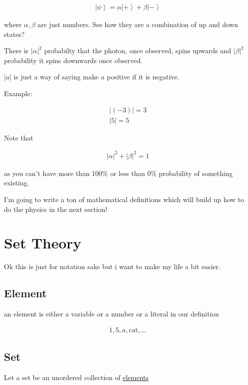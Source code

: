 \documentclass[
]{article}
\let\oldhyperref\hyperref
\renewcommand{\hyperref}[2][]{\oldhyperref[#1]{\underline{#2}}}
\providecommand{\ket}[1]{\left\lvert #1 \right\rangle}
\begin{document}
\begin{gather*}
	\ket{\psi}=\alpha\ket{+}+\beta\ket{-}
\end{gather*}

where \(\alpha,\beta\) are just numbers. See how they are a combination
of up and down states?

There is \(|\alpha|^2\) probabilty that the photon, once observed, spins
upwards and \(|\beta|^2\) probability it spins downwards once observed.



\(|a|\) is just a way of saying make \(a\) positive if it is negative.

Example:

\begin{gather*}
	|(-3)|=3\\
	|5|=5
\end{gather*}

Note that

\begin{gather*}
	|\alpha|^2+|\beta|^2=1
\end{gather*}

as you can't have more than 100\% or less than 0\% probability of
something existing.

I'm going to write a ton of mathematical definitions which will build up
how to do the physics in the next section!


\section{Set Theory}\label{set-theory}

Ok this is just for notation sake but i want to make my life a bit
easier.

\subsection{Element}\label{element}

an element is either a variable or a number or a literal in our
definition

\begin{gather*}
	1,5,a,\text{cat},...
\end{gather*}

\subsection{Set}\label{set}

Let a set be an unordered collection of
\hyperref[element]{elements}
\end{document}
